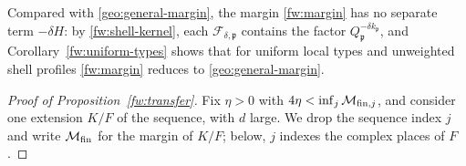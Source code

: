 \begin{remark}\label{fw:margin-comparison}
Compared with \eqref{geo:general-margin}, the margin \eqref{fw:margin}
has no separate term $-\delta H$: by \eqref{fw:shell-kernel}, each
$\mathcal F_{\delta,\mathfrak p}$ contains the factor $Q_{\mathfrak
p}^{-\delta k_{\mathfrak p}}$, and Corollary~\ref{fw:uniform-types}
shows that for uniform local types and unweighted shell profiles
\eqref{fw:margin} reduces to \eqref{geo:general-margin}.
\end{remark}

\begin{proof}[Proof of Proposition~\ref{fw:transfer}]
Fix $\eta>0$ with $4\eta<\inf_j\mathcal M_{{\rm fin},j}$, and consider
one extension $K/F$ of the sequence, with $d$ large. We drop the sequence
index $j$ and write $\mathcal M_{\rm fin}$ for the margin of $K/F$;
below, $j$ indexes the complex places of $F$.


\end{proof}
